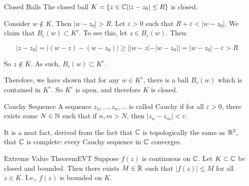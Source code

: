 \begin{ex}{Closed Balls}{} The closed ball $K = \{z\in \mathbb{C}| |z-z_0| \le R\}$ is closed.

Consider $w\not\in K$. Then $|w-z_0| > R$. Let $\varepsilon > 0$ such that $R + \varepsilon < |w- z_0|$. We claim that $B_{\varepsilon}(w) \subset K^c$. To see this, let $z\in B_{\varepsilon}(w)$. Then:

$$|z-z_0| = |(w-z) - (w-z_0)| \ge ||w-z| -|w-z_0|| = |w-z_0| - \varepsilon > R$$

So $z\not\in K$. As such, $B_{\varepsilon}(w) \subset K^c$.

Therefore, we have shown that for any $w\in K^c$, there is a ball $B_r(w)$ which is contained in $K^c$. So $K^c$ is open, and therefore $K$ is closed.
\end{ex}


\begin{defbo}{Cauchy Sequence}{} A sequence $z_1,\dots,z_n,\dots$ is called Cauchy if for all $\varepsilon > 0$, there exists some $N \in \mathbb{N}$ such that if $n,m > N$, then $|z_n - z_m| < \varepsilon$.
\end{defbo}

It is a neat fact, derived from the fact that $\mathbb{C}$ is topologically the same as $\mathbb{R}^2$, that $\mathbb{C}$ is complete: every Cauchy sequence in $\mathbb{C}$ converges.


\begin{thmbo}{Extreme Value Theorem}{EVT}
Suppose $f(z)$ is continuous on $\mathbb{C}$. Let $K\subset \mathbb{C}$ be closed and bounded. Then there exists $M\in \mathbb{R}$ such that $|f(z)| \le M$ for all $z\in K$. I.e., $f(z)$ is bounded on $K$.

\end{thmbo}

